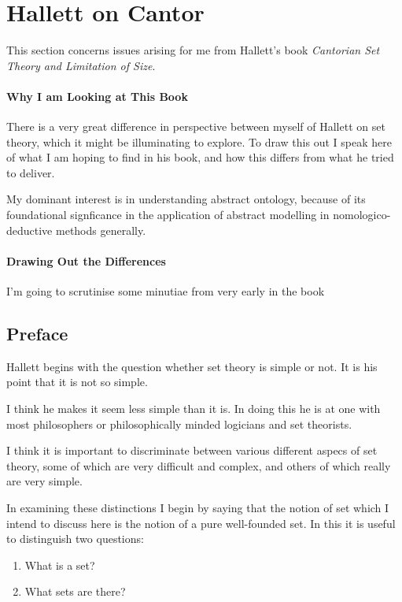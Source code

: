 
\section{Hallett on Cantor}

This section concerns issues arising for me from Hallett's book \emph{Cantorian Set Theory and Limitation of Size}\cite{hallettCSTALS}.

\paragraph{Why I am Looking at This Book}

There is a very great difference in perspective between myself of Hallett on set theory, which it might be illuminating to explore.
To draw this out I speak here of what I am hoping to find in his book, and how this differs from what he tried to deliver.

My dominant interest is in understanding abstract ontology, because of its foundational signficance in the application of abstract modelling in nomologico-deductive methods generally.



\paragraph{Drawing Out the Differences}

I'm going to scrutinise some minutiae from very early in the book

\subsection{Preface}

Hallett begins with the question whether set theory is simple or not.
It is his point that it is not so simple.

I think he makes it seem less simple than it is.
In doing this he is at one with most philosophers or philosophically minded logicians and set theorists.

I think it is important to discriminate between various different aspecs of set theory, some of which are very difficult and complex, and others of which really are very simple.

In examining these distinctions I begin by saying that the notion of set which I intend to discuss here is the notion of a pure well-founded set.
In this it is useful to distinguish two questions:
\begin{enumerate}
\item What is a set?
\item What sets are there?
\end{enumerate}

